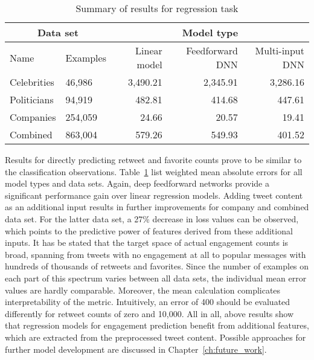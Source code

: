 \begin{table}
\begin{tabular}{llrrr}
\toprule
\multicolumn{2}{c}{Data set} & \multicolumn{3}{c}{Model type} \\
\midrule
Name & Examples & Linear model & Feedforward DNN & Multi-input DNN \\
\midrule
Celebrities & 46,986 & 3,490.21 & 2,345.91 & 3,286.16 \\
Politicians & 94,919 & 482.81 & 414.68 & 447.61 \\
Companies & 254,059 & 24.66 & 20.57 & 19.41 \\
Combined & 863,004 & 579.26 & 549.93 & 401.52 \\
\bottomrule
\end{tabular}
\caption{Summary of results for regression task}
\label{tab:summary_regression}
\end{table}

Results for directly predicting retweet and favorite counts prove to be similar
to the classification observations.
Table~\ref{tab:summary_regression} list weighted mean absolute errors for all model types
and data sets.
Again, deep feedforward networks provide a significant performance gain over
linear regression models.
Adding tweet content as an additional input results in further improvements for
company and combined data set.
For the latter data set, a 27\% decrease in loss values can be observed, which
points to the predictive power of features derived from these additional inputs.
It has be stated that the target space of actual engagement counts is broad, spanning
from tweets with no engagement at all to popular messages with hundreds of thousands
of retweets and favorites.
Since the number of examples on each part of this spectrum varies between all
data sets, the individual mean error values are hardly comparable.
Moreover, the mean calculation complicates interpretability of the metric.
Intuitively, an error of 400 should be evaluated differently for retweet counts
of zero and 10,000.
All in all, above results show that regression models for engagement prediction
benefit from additional features, which are extracted from the preprocessed
tweet content.
Possible approaches for further model development are discussed in Chapter~\ref{ch:future_work}.
